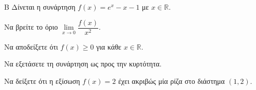 \begin{thema}{Β}
Δίνεται η συνάρτηση $f(x) = e^x - x - 1$ με $x \in \mathbb{R}$.
\begin{erwthma}
\item Να βρείτε το όριο $\lim\limits_{x \to 0} \dfrac{f(x)}{x^2}$.
\item Να αποδείξετε ότι $f(x) \ge 0$ για κάθε $x \in \mathbb{R}$.
\item Να εξετάσετε τη συνάρτηση ως προς την κυρτότητα.
\item Να δείξετε ότι η εξίσωση $f(x) = 2$ έχει ακριβώς μία ρίζα στο διάστημα $(1, 2)$.
\end{erwthma}
\end{thema}

